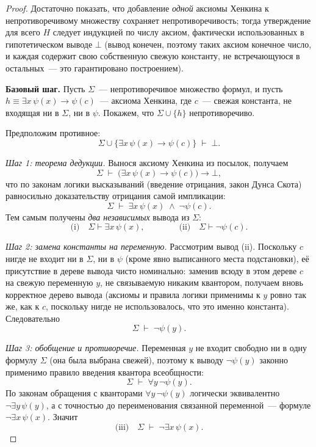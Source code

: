 \documentclass[12pt, a4paper]{article}
\theoremstyle{plain}
\theoremstyle{definition}
\newcommand{\proves}{\vdash}
\begin{document}
\begin{proof}
Достаточно показать, что добавление \emph{одной} аксиомы Хенкина
к непротиворечивому множеству сохраняет непротиворечивость; тогда
утверждение для всего $H$ следует индукцией по числу аксиом,
фактически использованных в гипотетическом выводе $\bot$
(вывод конечен, поэтому таких аксиом конечное число, и каждая
содержит свою собственную свежую константу, не встречающуюся
в остальных~--- это гарантировано построением).

\smallskip
\noindent\textbf{Базовый шаг.}
Пусть $\Sigma$~--- непротиворечивое множество формул, и пусть
$h \equiv \exists x\,\psi(x) \to \psi(c)$~--- аксиома Хенкина, где
$c$~--- свежая константа, не входящая ни в $\Sigma$, ни в $\psi$.
Покажем, что $\Sigma \cup \{h\}$ непротиворечиво.

Предположим противное:
\[
  \Sigma \cup \bigl\{\exists x\,\psi(x) \to \psi(c)\bigr\} \;\proves\; \bot.
\]

\textit{Шаг 1: теорема дедукции.}
Вынося аксиому Хенкина из посылок, получаем
\[
  \Sigma \;\proves\; \bigl(\exists x\,\psi(x) \to \psi(c)\bigr) \to \bot,
\]
что по законам логики высказываний (введение отрицания, закон
Дунса Скота) равносильно доказательству отрицания самой импликации:
\[
  \Sigma \;\proves\; \exists x\,\psi(x) \;\wedge\; \neg\psi(c).
\]
Тем самым получены \emph{два независимых} вывода из $\Sigma$:
\[
  \text{(i)}\quad \Sigma \proves \exists x\,\psi(x),
  \qquad\qquad
  \text{(ii)}\quad \Sigma \proves \neg\psi(c).
\]

\textit{Шаг 2: замена константы на переменную.}
Рассмотрим вывод (ii). Поскольку $c$ нигде не входит ни в $\Sigma$,
ни в $\psi$ (кроме явно выписанного места подстановки), её присутствие
в дереве вывода чисто номинально: заменив всюду в этом дереве $c$ на
свежую переменную $y$, не связываемую никаким квантором, получаем
вновь корректное дерево вывода (аксиомы и правила логики применимы
к $y$ ровно так же, как к $c$, поскольку нигде не использовалось,
что это именно константа). Следовательно
\[
  \Sigma \;\proves\; \neg\psi(y).
\]

\textit{Шаг 3: обобщение и противоречие.}
Переменная $y$ не входит свободно ни в одну формулу $\Sigma$ (она
была выбрана свежей), поэтому к выводу $\neg\psi(y)$ законно
применимо правило введения квантора всеобщности:
\[
  \Sigma \;\proves\; \forall y\,\neg\psi(y).
\]
По законам обращения с кванторами $\forall y\,\neg\psi(y)$ логически
эквивалентно $\neg\exists y\,\psi(y)$, а с точностью до переименования
связанной переменной~--- формуле $\neg\exists x\,\psi(x)$. Значит
\[
  \text{(iii)}\quad \Sigma \;\proves\; \neg\exists x\,\psi(x).
\]


\end{proof}
\end{document}
